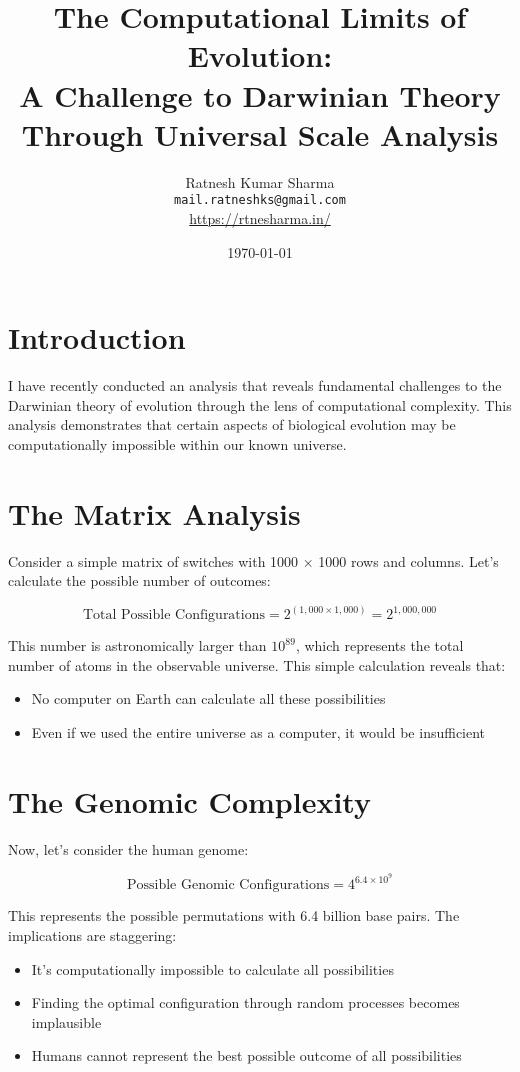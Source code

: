 \documentclass[11pt,a4paper]{article}
\title{\textcolor{titlecolor}{The Computational Limits of Evolution: \\ A Challenge to Darwinian Theory Through Universal Scale Analysis}}
\author{
    Ratnesh Kumar Sharma \\
    \texttt{mail.ratneshks@gmail.com} \\
    \url{https://rtnesharma.in/}
}
\date{\today}
\begin{document}
\maketitle

\section*{Introduction}
I have recently conducted an analysis that reveals fundamental challenges to the Darwinian theory of evolution through the lens of computational complexity. This analysis demonstrates that certain aspects of biological evolution may be computationally impossible within our known universe.

\section{The Matrix Analysis}
Consider a simple matrix of switches with 1000 × 1000 rows and columns. Let's calculate the possible number of outcomes:

$$ \text{Total Possible Configurations} = 2^{(1,000 \times 1,000)} = 2^{1,000,000} $$

This number is astronomically larger than $10^{89}$, which represents the total number of atoms in the observable universe. This simple calculation reveals that:

\begin{itemize}
    \item No computer on Earth can calculate all these possibilities
    \item Even if we used the entire universe as a computer, it would be insufficient
\end{itemize}

\section{The Genomic Complexity}
Now, let's consider the human genome:

$$ \text{Possible Genomic Configurations} = 4^{6.4 \times 10^9} $$

This represents the possible permutations with 6.4 billion base pairs. The implications are staggering:
\begin{itemize}
    \item It's computationally impossible to calculate all possibilities
    \item Finding the optimal configuration through random processes becomes implausible
    \item Humans cannot represent the best possible outcome of all possibilities
\end{itemize}
\end{document}

